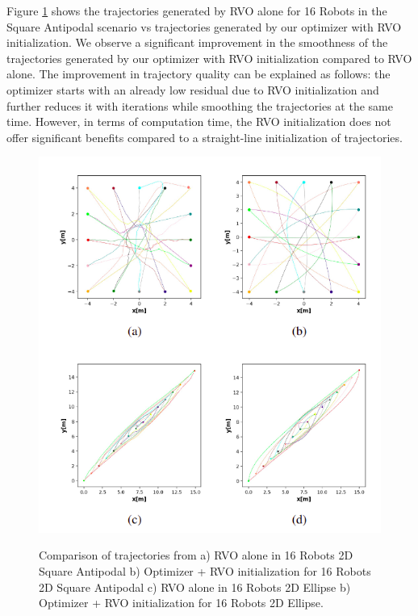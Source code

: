 Figure \ref{fig:RVO+opti_2D} shows the trajectories generated by RVO alone for 16 Robots in the Square Antipodal scenario vs trajectories generated by our optimizer with RVO initialization. We observe a significant improvement in the smoothness of the trajectories generated by our optimizer with RVO initialization compared to RVO alone. The improvement in trajectory quality can be explained as follows: the optimizer starts with an already low residual due to RVO initialization and further reduces it with iterations while smoothing the trajectories at the same time. However, in terms of computation time, the RVO initialization does not offer significant benefits compared to a straight-line initialization of trajectories. 

\begin{figure}[H]
    \centering
    {\includegraphics[scale=0.6]{figures/appendix/RVO_inits.png}} 
    \caption[Appendix: Trajectories using RVO + multi-robot optimizer]{Comparison of trajectories from a) RVO alone in 16 Robots 2D Square Antipodal b) Optimizer + RVO initialization for 16 Robots 2D Square Antipodal c) RVO alone in 16 Robots 2D Ellipse b) Optimizer + RVO initialization for 16 Robots 2D Ellipse.}
    \label{fig:RVO+opti_2D}
\end{figure}

